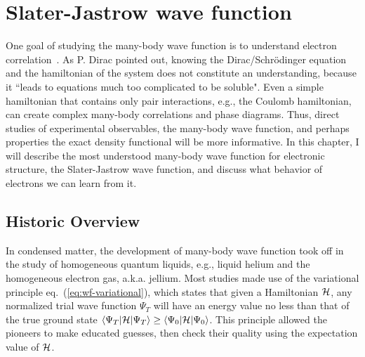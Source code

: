 \chapter{Slater-Jastrow wave function}

One goal of studying the many-body wave function is to understand electron correlation~\cite{Ceperley1999-wf}. As P. Dirac pointed out, knowing the Dirac/Schr\"odinger equation and the hamiltonian of the system does not constitute an understanding, because it ``leads to equations much too complicated to be soluble". Even a simple hamiltonian that contains only pair interactions, e.g., the Coulomb hamiltonian, can create complex many-body correlations and phase diagrams.
Thus, direct studies of experimental observables, the many-body wave function, and perhaps properties the exact density functional will be more informative.
In this chapter, I will describe the most understood many-body wave function for electronic structure, the Slater-Jastrow wave function, and discuss what behavior of electrons we can learn from it.

\section{Historic Overview}

In condensed matter, the development of many-body wave function took off in the study of homogeneous quantum liquids, e.g., liquid helium and the homogeneous electron gas, a.k.a. jellium. Most studies made use of the variational principle eq.~(\ref{eq:wf-variational}), which states that given a Hamiltonian $\mathcal{H}$, any normalized trial wave function $\Psi_T$ will have an energy value no less than that of the true ground state $\braket{\Psi_T|\mathcal{H}|\Psi_T}\ge\braket{\Psi_0|\mathcal{H}|\Psi_0}$. This principle allowed the pioneers to make educated guesses, then check their quality using the expectation value of $\mathcal{H}$.

